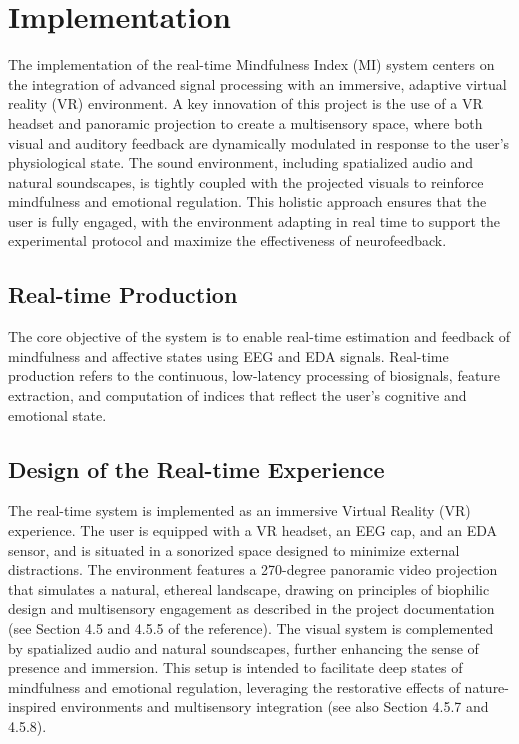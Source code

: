 \section{Implementation}

The implementation of the real-time Mindfulness Index (MI) system centers on the integration of advanced signal processing with an immersive, adaptive virtual reality (VR) environment. A key innovation of this project is the use of a VR headset and panoramic projection to create a multisensory space, where both visual and auditory feedback are dynamically modulated in response to the user’s physiological state. The sound environment, including spatialized audio and natural soundscapes, is tightly coupled with the projected visuals to reinforce mindfulness and emotional regulation. This holistic approach ensures that the user is fully engaged, with the environment adapting in real time to support the experimental protocol and maximize the effectiveness of neurofeedback.
\subsection{Real-time Production}
\label{sec:realtime_production}

The core objective of the system is to enable real-time estimation and feedback of mindfulness and affective states using EEG and EDA signals. Real-time production refers to the continuous, low-latency processing of biosignals, feature extraction, and computation of indices that reflect the user’s cognitive and emotional state.

\subsection*{Design of the Real-time Experience}
The real-time system is implemented as an immersive Virtual Reality (VR) experience. The user is equipped with a VR headset, an EEG cap, and an EDA sensor, and is situated in a sonorized space designed to minimize external distractions. The environment features a 270-degree panoramic video projection that simulates a natural, ethereal landscape, drawing on principles of biophilic design and multisensory engagement as described in the project documentation (see Section 4.5 and 4.5.5 of the reference). The visual system is complemented by spatialized audio and natural soundscapes, further enhancing the sense of presence and immersion. This setup is intended to facilitate deep states of mindfulness and emotional regulation, leveraging the restorative effects of nature-inspired environments and multisensory integration (see also Section 4.5.7 and 4.5.8).

